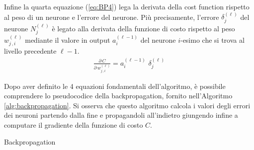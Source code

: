 Infine la quarta equazione (\ref{eq:BP4}) lega la derivata della cost function rispetto al peso di un neurone e l'errore del neurone. Più precisamente, l'errore $\delta^{(\ell)}_j$ del neurone $N^{(\ell)}_j$ è legato alla derivata della funzione di costo rispetto al peso $w^{(\ell)}_{j\,,i}$ mediante il valore in output $a^{(\ell - 1)}_i$ del neurone $i$-esimo che si trova al livello precedente $\ell - 1$. 
% 
\begin{gather}
    \frac{\partial\,C}{\partial\,w^{(\ell)}_{j\,,i}} = a^{(\ell - 1)}_i\,\,\delta^{(\ell)}_j
    \label{eq:BP4}
\end{gather}

Dopo aver definito le 4 equazioni fondamentali dell'algoritmo, è possibile comprendere lo pseudocodice della backpropagation, fornito nell'Algoritmo\,\ref{alg:backpropagation}. Si osserva che questo algoritmo calcola i valori degli errori dei neuroni partendo dalla fine e propagandoli all'indietro giungendo infine a computare il gradiente della funzione di costo $C$.

\begin{algorithm}[ht]
    \caption{Backpropagation}\label{alg:backpropagation}
    \begin{algorithmic}
        \STATE\,
        \STATE\,

        \STATE\,


        \STATE\,


        \STATE\,
        \STATE\,

    \end{algorithmic}
\end{algorithm}


